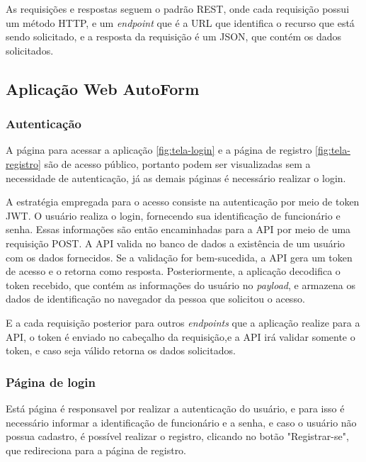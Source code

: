 As requisições e respostas seguem o padrão REST, onde cada requisição possui um método HTTP, e um \textit{endpoint} que é a URL que identifica o recurso que está sendo solicitado, e a resposta da requisição é um JSON, que contém os dados solicitados.



\subsection{Aplicação Web AutoForm}

\subsubsection{Autenticação}

A página para acessar a aplicação \autoref{fig:tela-login} e a página de registro \autoref{fig:tela-registro} são de acesso público, portanto podem ser visualizadas sem a necessidade de autenticação, já as demais páginas é necessário realizar o login.

A estratégia empregada para o acesso consiste na autenticação por meio de token JWT. O usuário realiza o login, fornecendo sua identificação de funcionário e senha. Essas informações são então encaminhadas para a API por meio de uma requisição POST. 
A API valida no banco de dados a existência de um usuário com os dados fornecidos. 
Se a validação for bem-sucedida, a API gera um token de acesso e o retorna como resposta. Posteriormente, a aplicação decodifica o token recebido, que contém as informações do usuário no \textit{payload}, e armazena os dados de identificação no navegador da pessoa que solicitou o acesso.

E a cada requisição posterior para outros \textit{endpoints} que a aplicação realize para a API, o token é enviado no cabeçalho da requisição,e a API irá validar somente o token, e caso seja válido retorna os dados solicitados.

\subsubsection{Página de login}
Está página é responsavel por realizar a autenticação do usuário, e para isso é necessário informar a identificação de funcionário e a senha, e caso o usuário não possua cadastro, é possível realizar o registro, clicando no botão "Registrar-se", que redireciona para a página de registro.


